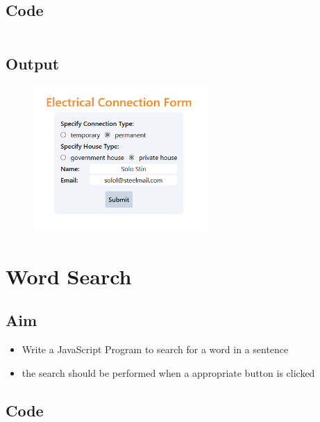 \documentclass{article}
\begin{document}
\subsection{Code}
\inputminted[frame=lines, breaklines, breakanywhere, numberblanklines=false]{html}{./prog_7/index.html}

\subsection{Output}
\begin{figure}[h!]
	\centering
	\includegraphics[width=0.6\textwidth]{./Assets/p07.png}
\end{figure}
\newpage

\section{Word Search}
\subsection{Aim}
\begin{itemize}
	\item Write a JavaScript Program to search for a word in a sentence
	\item the search should be performed when a appropriate button is clicked
\end{itemize}

\subsection{Code}
\inputminted[frame=lines, breaklines, breakanywhere, numberblanklines=false]{html}{./prog_8/index.html}

\newpage
\end{document}
